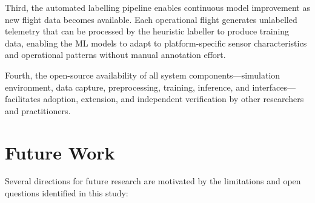 Third, the automated labelling pipeline enables continuous model improvement as new flight data becomes available. Each operational flight generates unlabelled telemetry that can be processed by the heuristic labeller to produce training data, enabling the ML models to adapt to platform-specific sensor characteristics and operational patterns without manual annotation effort.

Fourth, the open-source availability of all system components---simulation environment, data capture, preprocessing, training, inference, and interfaces---facilitates adoption, extension, and independent verification by other researchers and practitioners.

\section{Future Work}

Several directions for future research are motivated by the limitations and open questions identified in this study:

